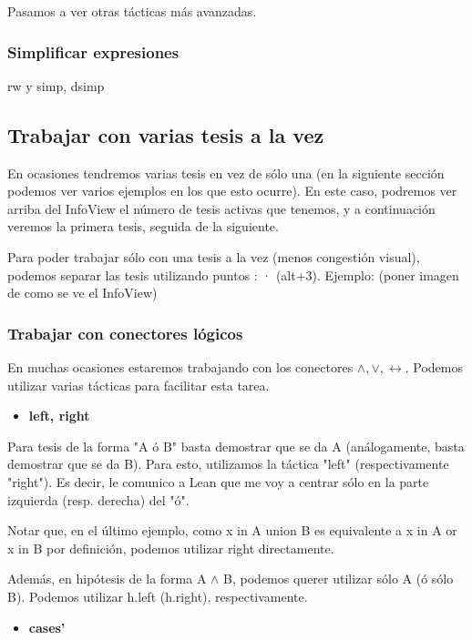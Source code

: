 \documentclass{article}
\begin{document}
Pasamos a ver otras tácticas más avanzadas.

\subsubsection{Simplificar expresiones}

rw y simp, dsimp

\subsection{Trabajar con varias tesis a la vez}

En ocasiones tendremos varias tesis en vez de sólo una (en la siguiente sección podemos ver varios ejemplos en los que esto ocurre). En este caso, podremos ver arriba del InfoView el número de tesis activas que tenemos, y a continuación veremos la primera tesis, seguida de la siguiente.

Para poder trabajar sólo con una tesis a la vez (menos congestión visual), podemos separar las tesis utilizando puntos : · (alt+3). Ejemplo: (poner imagen de como se ve el InfoView)

\subsubsection{Trabajar con conectores lógicos}

En muchas ocasiones estaremos trabajando con los conectores $\land, \lor, \leftrightarrow$. Podemos utilizar varias tácticas para facilitar esta tarea.

\begin{itemize}
    \item \textbf{left, right}
\end{itemize}

Para tesis de la forma "A ó B" basta demostrar que se da A (análogamente, basta demostrar que se da B). Para esto, utilizamos la táctica "left" (respectivamente "right"). Es decir, le comunico a Lean que me voy a centrar sólo en la parte izquierda (resp. derecha) del "ó".


Notar que, en el último ejemplo, como x in A union B es equivalente a x in A or x in B por definición, podemos utilizar right directamente.

Además, en hipótesis de la forma A $\land$ B, podemos querer utilizar sólo A (ó sólo B). Podemos utilizar h.left (h.right), respectivamente.

\begin{itemize}
    \item \textbf{cases'}
\end{itemize}
\end{document}
